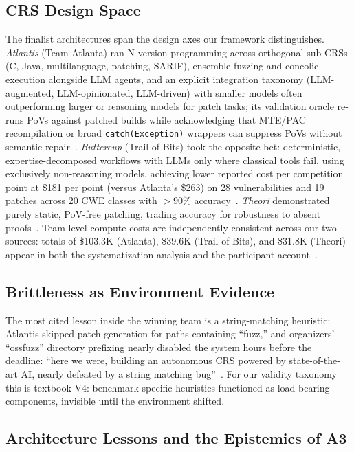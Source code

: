 \documentclass[conference,compsoc]{IEEEtran}
\begin{document}
\subsection{CRS Design Space}
The finalist architectures span the design axes our framework distinguishes.
\emph{Atlantis} (Team Atlanta) ran N-version programming across orthogonal sub-CRSs (C, Java,
multilanguage, patching, SARIF), ensemble fuzzing and concolic execution alongside LLM agents,
and an explicit integration taxonomy (LLM-augmented, LLM-opinionated, LLM-driven) with
smaller models often outperforming larger or reasoning models for patch tasks; its
validation oracle re-runs PoVs against patched builds while acknowledging that MTE/PAC
recompilation or broad \texttt{catch(Exception)} wrappers can suppress PoVs without semantic
repair~\cite{taafc2025}. \emph{Buttercup} (Trail of Bits) took the opposite bet:
deterministic, expertise-decomposed workflows with LLMs only where classical tools fail,
using exclusively non-reasoning models, achieving lower reported cost per competition point at
\$181 per point (versus Atlanta's \$263) on 28 vulnerabilities and 19 patches across 20 CWE
classes with ${>}90\%$ accuracy~\cite{tobbuttercup2025,r7sokaixcc2026}. \emph{Theori}
demonstrated purely static, PoV-free patching, trading accuracy for robustness to absent
proofs~\cite{taafc2025}. Team-level compute costs are independently consistent across our two
sources: totals of \$103.3K (Atlanta), \$39.6K (Trail of Bits), and \$31.8K (Theori) appear in
both the systematization analysis and the participant account~\cite{r7sokaixcc2026,tobbuttercup2025}.

\subsection{Brittleness as Environment Evidence}
The most cited lesson inside the winning team is a string-matching heuristic: Atlantis skipped
patch generation for paths containing ``fuzz,'' and organizers' ``ossfuzz'' directory prefixing
nearly disabled the system hours before the deadline: ``here we were, building an autonomous
CRS powered by state-of-the-art AI, nearly defeated by a string matching bug''~\cite{taafc2025}.
For our validity taxonomy this is textbook V4: benchmark-specific heuristics functioned as
load-bearing components, invisible until the environment shifted.
\subsection{Architecture Lessons and the Epistemics of A3}
\end{document}
